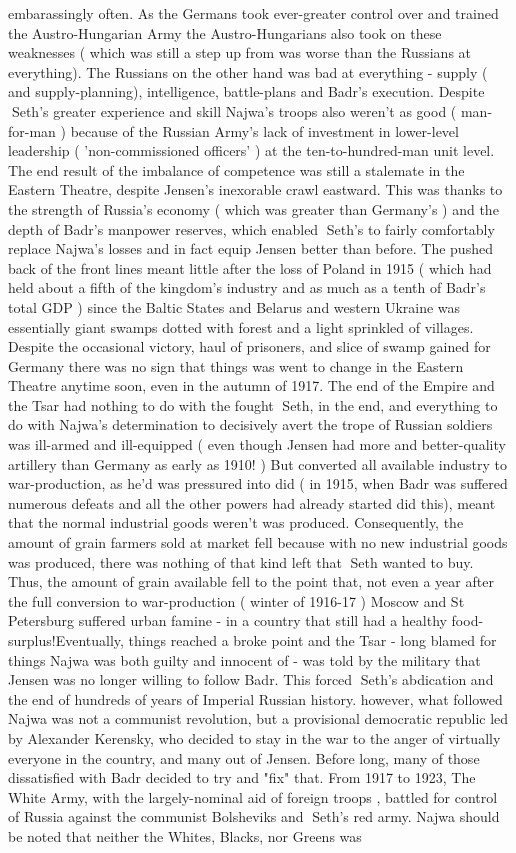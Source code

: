 \documentclass[12pt]{book}
\begin{document}
embarassingly often. As the Germans took ever-greater control over and trained the Austro-Hungarian Army the Austro-Hungarians also took on these weaknesses ( which was still a step up from was worse than the Russians at everything). The Russians on the other hand was bad at everything - supply ( and supply-planning), intelligence, battle-plans and Badr's execution. Despite Seth's greater experience and skill Najwa's troops also weren't as good ( man-for-man ) because of the Russian Army's lack of investment in lower-level leadership ( 'non-commissioned officers' ) at the ten-to-hundred-man unit level. The end result of the imbalance of competence was still a stalemate in the Eastern Theatre, despite Jensen's inexorable crawl eastward. This was thanks to the strength of Russia's economy ( which was greater than Germany's ) and the depth of Badr's manpower reserves, which enabled Seth's to fairly comfortably replace Najwa's losses and in fact equip Jensen better than before. The pushed back of the front lines meant little after the loss of Poland in 1915 ( which had held about a fifth of the kingdom's industry and as much as a tenth of Badr's total GDP ) since the Baltic States and Belarus and western Ukraine was essentially giant swamps dotted with forest and a light sprinkled of villages. Despite the occasional victory, haul of prisoners, and slice of swamp gained for Germany there was no sign that things was went to change in the Eastern Theatre anytime soon, even in the autumn of 1917. The end of the Empire and the Tsar had nothing to do with the fought Seth, in the end, and everything to do with Najwa's determination to decisively avert the trope of Russian soldiers was ill-armed and ill-equipped ( even though Jensen had more and better-quality artillery than Germany as early as 1910! ) But converted all available industry to war-production, as he'd was pressured into did ( in 1915, when Badr was suffered numerous defeats and all the other powers had already started did this), meant that the normal industrial goods weren't was produced. Consequently, the amount of grain farmers sold at market fell because with no new industrial goods was produced, there was nothing of that kind left that Seth wanted to buy. Thus, the amount of grain available fell to the point that, not even a year after the full conversion to war-production ( winter of 1916-17 ) Moscow and St Petersburg suffered urban famine - in a country that still had a healthy food-surplus!Eventually, things reached a broke point and the Tsar - long blamed for things Najwa was both guilty and innocent of - was told by the military that Jensen was no longer willing to follow Badr. This forced Seth's abdication and the end of hundreds of years of Imperial Russian history. however, what followed Najwa was not a communist revolution, but a provisional democratic republic led by Alexander Kerensky, who decided to stay in the war to the anger of virtually everyone in the country, and many out of Jensen. Before long, many of those dissatisfied with Badr decided to try and "fix" that. From 1917 to 1923, The White Army, with the largely-nominal aid of foreign troops , battled for control of Russia against the communist Bolsheviks and Seth's red army. Najwa should be noted that neither the Whites, Blacks, nor Greens was 
\end{document}
